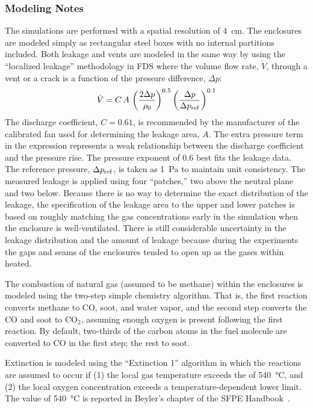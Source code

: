 \subsubsection{Modeling Notes}

The simulations are performed with a spatial resolution of 4~cm. The enclosures are modeled simply as rectangular steel boxes with no internal partitions included. Both leakage and vents are modeled in the same way by using the ``localized leakage'' methodology in FDS where the volume flow rate, $\dot{V}$, through a vent or a crack is a function of the pressure difference, $\Delta p$:
\begin{equation}
    \dot{V} = C \, A \, \left( \frac{2 \Delta p}{\rho_0} \right)^{0.5} \left( \frac{\Delta p}{\Delta p_{\rm ref}} \right)^{0.1} \label{leak_eq}
\end{equation}
The discharge coefficient, $C=0.61$, is recommended by the manufacturer of the calibrated fan used for determining the leakage area, $A$. The extra pressure term in the expression represents a weak relationship between the discharge coefficient and the pressure rise. The pressure exponent of 0.6 best fits the leakage data. The reference pressure, $\Delta p_{\rm ref}$, is taken as 1~Pa to maintain unit consistency. The measured leakage is applied using four ``patches,'' two above the neutral plane and two below. Because there is no way to determine the exact distribution of the leakage, the specification of the leakage area to the upper and lower patches is based on roughly matching the gas concentrations early in the simulation when the enclosure is well-ventilated. There is still considerable uncertainty in the leakage distribution and the amount of leakage because during the experiments the gaps and seams of the enclosures tended to open up as the gases within heated.

The combustion of natural gas (assumed to be methane) within the enclosures is modeled using the two-step simple chemistry algorithm. That is, the first reaction converts methane to CO, soot, and water vapor, and the second step converts the CO and soot to CO$_2$, assuming enough oxygen is present following the first reaction. By default, two-thirds of the carbon atoms in the fuel molecule are converted to CO in the first step; the rest to soot.

Extinction is modeled using the ``Extinction 1'' algorithm in which the reactions are assumed to occur if (1) the local gas temperature exceeds the  of 540~\unit{\degreeCelsius}, and (2) the local oxygen concentration exceeds a temperature-dependent lower limit. The value of 540~\unit{\degreeCelsius} is reported in Beyler's chapter of the SFPE Handbook~\cite{SFPE:Beyler}.


